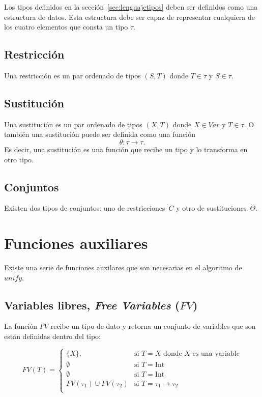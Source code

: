 \documentclass{article}
\theoremstyle{definition}
\begin{document}
Los tipos definidos en la sección~\ref{sec:lenguajetipos} deben ser
definidos como una estructura de datos. Esta estructura debe ser capaz
de representar cualquiera de los cuatro elementos que consta un tipo
$\tau$.

\subsection{Restricción}
\label{sec:estrurest}

Una restricción es un par ordenado de tipos $(S,T)$ donde $T \in \tau$
y $S \in \tau$.

\subsection{Sustitución}
\label{sec:estrsust}

Una sustitución es un par ordenado de tipos $(X,T)$ donde $X \in Var$
y $T \in \tau$. O también una sustitución puede ser definida como una
función
\begin{equation*}
  \theta : \tau \to \tau.
\end{equation*}
Es decir, una sustitución es una función que recibe un tipo y lo
transforma en otro tipo.

\subsection{Conjuntos}
\label{sec:conjuntos}

Existen dos tipos de conjuntos: uno de restricciones~$C$ y otro de
sustituciones~$\Theta$.


\section{Funciones auxiliares}
\label{sec:funaux}

Existe una serie de funciones auxilares que son necesarias en el
algoritmo de $unify$.

\subsection{Variables libres, \emph{Free Variables} ($FV$) }
\label{sec:fv}

La función $FV$ recibe un tipo de dato y retorna un conjunto de
variables que son están definidas dentro del tipo:

\[
  FV(T) =
  \begin{cases}
    \{X\}, & \text{si $T = X$ donde $X$ es una variable} \\
    \emptyset & \text{si $T = \text{Int}$} \\
    \emptyset & \text{si $T = \text{Int}$} \\
    FV(\tau_1) \cup FV(\tau_2) & \text{si $T = \tau_1 \to \tau_2$} \\
  \end{cases}
\]
\end{document}
